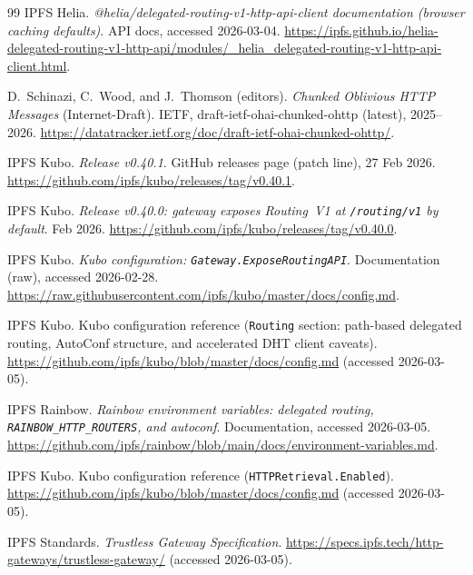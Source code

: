 \documentclass[11pt]{article}
\begin{document}
\begin{thebibliography}{99}
IPFS Helia.
\newblock \emph{@helia/delegated-routing-v1-http-api-client documentation (browser caching defaults)}.
\newblock API docs, accessed 2026-03-04.
\newblock \url{https://ipfs.github.io/helia-delegated-routing-v1-http-api/modules/_helia_delegated-routing-v1-http-api-client.html}.

D.~Schinazi, C.~Wood, and J.~Thomson (editors).
\newblock \emph{Chunked Oblivious HTTP Messages} (Internet-Draft).
\newblock IETF, draft-ietf-ohai-chunked-ohttp (latest), 2025--2026.
\newblock \url{https://datatracker.ietf.org/doc/draft-ietf-ohai-chunked-ohttp/}.

IPFS Kubo.
\newblock \emph{Release v0.40.1}.
\newblock GitHub releases page (patch line), 27 Feb 2026.
\newblock \url{https://github.com/ipfs/kubo/releases/tag/v0.40.1}.

IPFS Kubo.
\newblock \emph{Release v0.40.0: gateway exposes Routing~V1 at \texttt{/routing/v1} by default}.
 Feb 2026.
\newblock \url{https://github.com/ipfs/kubo/releases/tag/v0.40.0}.

IPFS Kubo.
\newblock \emph{Kubo configuration: \texttt{Gateway.ExposeRoutingAPI}}.
\newblock Documentation (raw), accessed 2026-02-28.
\newblock \url{https://raw.githubusercontent.com/ipfs/kubo/master/docs/config.md}.

IPFS Kubo.
\newblock Kubo configuration reference (\texttt{Routing} section: path-based delegated routing, AutoConf structure, and accelerated DHT client caveats).
\newblock \url{https://github.com/ipfs/kubo/blob/master/docs/config.md} (accessed 2026-03-05).



IPFS Rainbow.
\newblock \emph{Rainbow environment variables: delegated routing, \texttt{RAINBOW\_HTTP\_ROUTERS}, and autoconf}.
\newblock Documentation, accessed 2026-03-05.
\newblock \url{https://github.com/ipfs/rainbow/blob/main/docs/environment-variables.md}.

IPFS Kubo.
\newblock Kubo configuration reference (\texttt{HTTPRetrieval.Enabled}).
\newblock \url{https://github.com/ipfs/kubo/blob/master/docs/config.md} (accessed 2026-03-05).

IPFS Standards.
\newblock \emph{Trustless Gateway Specification}.
\newblock \url{https://specs.ipfs.tech/http-gateways/trustless-gateway/} (accessed 2026-03-05).

\end{thebibliography}
\end{document}
